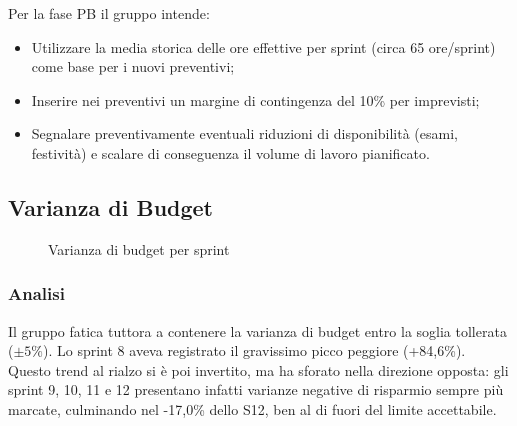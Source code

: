 \documentclass[a4paper,11pt,oneside]{scrartcl}
\begin{document}
Per la fase PB il gruppo intende:
\begin{itemize}
    \item Utilizzare la media storica delle ore effettive per sprint (circa 65 ore/sprint) come base per i nuovi preventivi;
    \item Inserire nei preventivi un margine di contingenza del 10\% per imprevisti;
    \item Segnalare preventivamente eventuali riduzioni di disponibilità (esami, festività) e scalare di conseguenza il volume di lavoro pianificato.
\end{itemize}

\subsection{Varianza di Budget}

\begin{figure}[H]
\centering
{}
\caption{Varianza di budget per sprint}
\label{fig:varianza_budget}
\end{figure}

\subsubsection*{Analisi}

Il gruppo fatica tuttora a contenere la varianza di budget entro la soglia tollerata ($\pm 5\%$). Lo sprint 8 aveva registrato il gravissimo picco peggiore (+84,6\%). Questo trend al rialzo si è poi invertito, ma ha sforato nella direzione opposta: gli sprint 9, 10, 11 e 12 presentano infatti varianze negative di risparmio sempre più marcate, culminando nel -17,0\% dello S12, ben al di fuori del limite accettabile.
\end{document}
